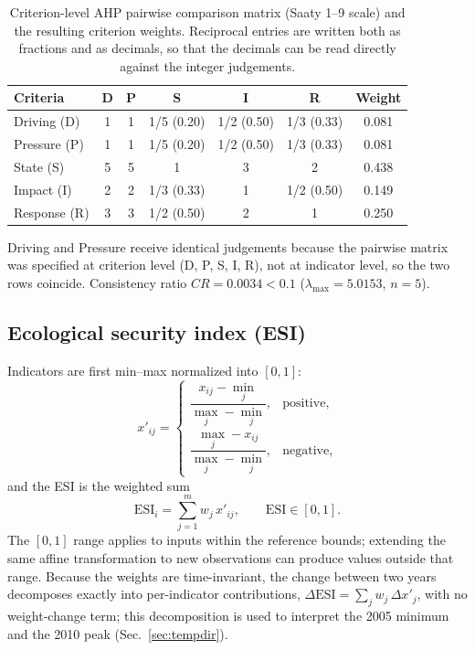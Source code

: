 \documentclass[preprint,11pt,authoryear]{elsarticle}
\begin{document}
\begin{table}[htbp]
\centering
\caption{Criterion-level AHP pairwise comparison matrix (Saaty 1--9 scale) and the resulting criterion weights. Reciprocal entries are written both as fractions and as decimals, so that the decimals can be read directly against the integer judgements.}
\label{tab:ahp}
\small
\begin{tabular}{lcccccc}
\toprule
Criteria & D & P & S & I & R & Weight \\
\midrule
Driving (D) & 1 & 1 & 1/5 (0.20) & 1/2 (0.50) & 1/3 (0.33) & 0.081 \\
Pressure (P) & 1 & 1 & 1/5 (0.20) & 1/2 (0.50) & 1/3 (0.33) & 0.081 \\
State (S) & 5 & 5 & 1 & 3 & 2 & 0.438 \\
Impact (I) & 2 & 2 & 1/3 (0.33) & 1 & 1/2 (0.50) & 0.149 \\
Response (R) & 3 & 3 & 1/2 (0.50) & 2 & 1 & 0.250 \\
\bottomrule
\end{tabular}

\vspace{2pt}
{\scriptsize Driving and Pressure receive identical judgements because the pairwise matrix was specified at criterion level (D, P, S, I, R), not at indicator level, so the two rows coincide. Consistency ratio $CR=0.0034<0.1$ ($\lambda_{\max}=5.0153$, $n=5$).}
\end{table}

\subsection{Ecological security index (ESI)}
\label{sec:esi}
Indicators are first min--max normalized into $[0,1]$:
\begin{equation}
x'_{ij}=\begin{cases}\dfrac{x_{ij}-\min_j}{\max_j-\min_j}, & \text{positive},\\[2mm]
\dfrac{\max_j-x_{ij}}{\max_j-\min_j}, & \text{negative},\end{cases}
\label{eq:norm}
\end{equation}
and the ESI is the weighted sum
\begin{equation}
\mathrm{ESI}_i=\sum_{j=1}^{m}w_j\,x'_{ij},\qquad \mathrm{ESI}\in[0,1].
\label{eq:esi}
\end{equation}
The $[0,1]$ range applies to inputs within the reference bounds; extending the same affine transformation to new observations can produce values outside that range. Because the weights are time-invariant, the change between two years decomposes exactly into per-indicator contributions, $\Delta\mathrm{ESI}=\sum_j w_j\,\Delta x'_j$, with no weight-change term; this decomposition is used to interpret the 2005 minimum and the 2010 peak (Sec.~\ref{sec:tempdir}).
\end{document}
